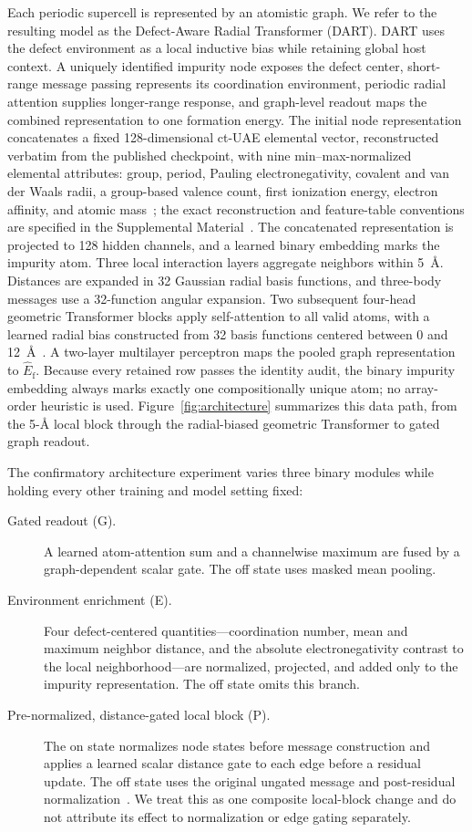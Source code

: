 Each periodic supercell is represented by an atomistic graph.  We refer to the
resulting model as the Defect-Aware Radial Transformer (DART).  DART uses the
defect environment as a local inductive bias while retaining global host
context.  A uniquely identified impurity node exposes the defect center,
short-range message passing represents its coordination environment, periodic
radial attention supplies longer-range response, and graph-level readout maps
the combined representation to one formation energy.  The initial
node representation concatenates a fixed 128-dimensional ct-UAE elemental
vector, reconstructed verbatim from the published checkpoint, with nine
min--max-normalized elemental attributes: group, period, Pauling
electronegativity, covalent and van der Waals radii, a group-based valence
count, first ionization energy, electron affinity, and atomic
mass~\cite{ctuae2025}; the exact reconstruction and feature-table
conventions are specified in the Supplemental
Material~\cite{supplemental}.  The concatenated representation is
projected to 128 hidden channels, and a learned binary embedding marks the
impurity atom.  Three local interaction layers aggregate neighbors within
5~\AA.  Distances are expanded in 32 Gaussian radial basis functions, and
three-body messages use a 32-function angular expansion.  Two subsequent
four-head geometric Transformer blocks apply self-attention to all valid atoms,
with a learned radial bias constructed from 32 basis functions centered between
0 and 12~\AA~\cite{crystalformer2024}.  A two-layer multilayer perceptron
maps the pooled graph representation to $\hat E_{\mathrm f}$.
Because every retained row passes the identity audit, the binary impurity
embedding always marks exactly one compositionally unique atom; no array-order
heuristic is used.  Figure~\ref{fig:architecture} summarizes this data path,
from the 5-\AA{} local block through the radial-biased geometric Transformer
to gated graph readout.

The confirmatory architecture experiment varies three binary modules while
holding every other training and model setting fixed:
\begin{description}
 \item[Gated readout (G).]
 A learned atom-attention sum and a channelwise maximum are fused by a
 graph-dependent scalar gate.  The off state uses masked mean pooling.
 \item[Environment enrichment (E).]
 Four defect-centered quantities---coordination number, mean and maximum
 neighbor distance, and the absolute electronegativity contrast to the local
 neighborhood---are normalized, projected, and added only to the impurity
 representation.  The off state omits this branch.
 \item[Pre-normalized, distance-gated local block (P).]
 The on state normalizes node states before message construction and applies a
 learned scalar distance gate to each edge before a residual update.  The off
 state uses the original ungated message and post-residual
 normalization~\cite{xiong2020}.  We treat this as one composite local-block
 change and do not attribute its effect to normalization or edge gating
 separately.
\end{description}

